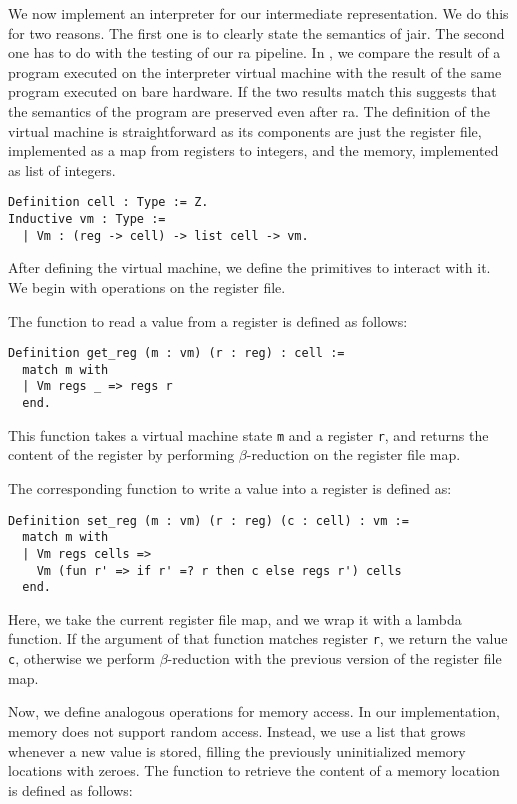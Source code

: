 We now implement an interpreter for our intermediate representation. We do this for two reasons. The first one is to clearly state the semantics of \gls{jair}. The second one has to do with the testing of our \gls{ra} pipeline. In , we compare the result of a program executed on the interpreter virtual machine with the result of the same program executed on bare hardware. If the two results match this suggests that the semantics of the program are preserved even after \gls{ra}.
The definition of the virtual machine is straightforward as its components are just the register file, implemented as a map from registers to integers, and the memory, implemented as list of integers.

\begin{lstlisting}[style=Rocq]
Definition cell : Type := Z.
Inductive vm : Type :=
  | Vm : (reg -> cell) -> list cell -> vm.
\end{lstlisting}

After defining the virtual machine, we define the primitives to interact with it. We begin with operations on the register file.

The function to read a value from a register is defined as follows:

\begin{lstlisting}[style=Rocq]
Definition get_reg (m : vm) (r : reg) : cell :=
  match m with
  | Vm regs _ => regs r
  end.
\end{lstlisting}

This function takes a virtual machine state \texttt m and a register \texttt r, and returns the content of the register  by performing $\beta$-reduction on the register file map.

The corresponding function to write a value into a register is defined as:

\begin{lstlisting}[style=Rocq]
Definition set_reg (m : vm) (r : reg) (c : cell) : vm :=
  match m with
  | Vm regs cells =>
    Vm (fun r' => if r' =? r then c else regs r') cells
  end.
\end{lstlisting}

Here, we take the current register file map, and we wrap it with a lambda function. If the argument of that function matches register \texttt r, we return the value \texttt c, otherwise we perform $\beta$-reduction with the previous version of the register file map.

Now, we define analogous operations for memory access. In our implementation, memory does not support random access. Instead, we use a list that grows whenever a new value is stored, filling the previously uninitialized memory locations with zeroes. The function to retrieve the content of a memory location is defined as follows:

